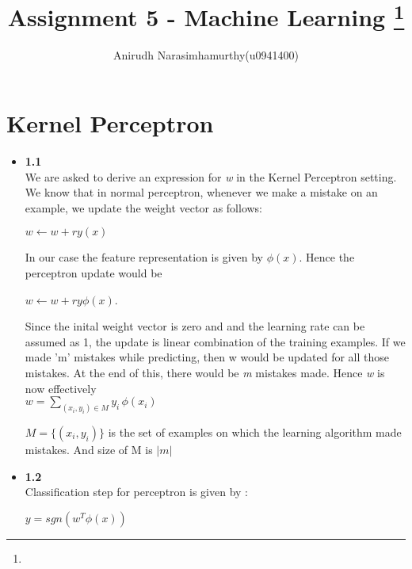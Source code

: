 \documentclass[11pt]{article}
\title{Assignment 5 - Machine Learning
\footnote{\s{CS 6350 ; \;\; Spring 2015 \hfill}
}
}
\author{Anirudh Narasimhamurthy(u0941400)}
\begin{document}
\maketitle

\lstset{language=python} 


\section{Kernel Perceptron}

\begin{itemize}
	\item[] \textbf{1.1}\\
	
	 We are asked to derive an expression for \emph w in the Kernel Perceptron setting. \\
	We know that in normal perceptron, whenever we make a mistake on an example, we update the weight vector as follows:
	\begin{center}
	$w \leftarrow w + r y (x)$
	\end{center}
	In our case the feature representation is given by $\phi(x)$. Hence the perceptron update would be 
	\begin{center}
	$w \leftarrow w + r y \phi(x)$.
	\end{center}
	
Since the inital weight vector is zero and and the learning rate can be assumed as 1, the update is linear combination of the training examples. If we made 'm' mistakes while predicting, then w would be updated for all those mistakes. At the end of this, there would be \emph m  mistakes made. Hence \emph w is now effectively\\

$\boxed{w = \sum_{(x_i, y_i) \in M} y_i \, \phi(x_i)}$

$M =\{(x_i, y_i)\}$ is the set of examples on which the learning
algorithm made mistakes. And size of M is $|m |$\\


\item[] \textbf{1.2}\\

Classification step for perceptron is given by :
\begin{center}
	$y=sgn\left(w^T\phi(x)\right)$
\end{center}
 

\end{itemize}
\end{document}
